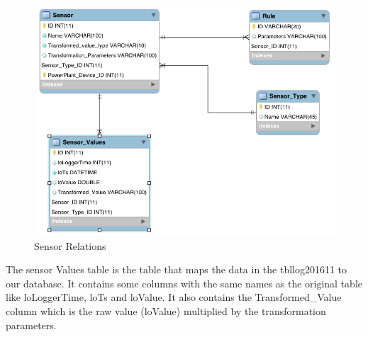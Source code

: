 \begin{figure}[H]
\centering
\includegraphics[scale=0.5]{Images/SensorRelations.png}
\caption[Sensor Relations]{Sensor Relations}
\end{figure}
The sensor Values table is the table that maps the data in the tbllog201611 to our database. It contains some columns with the same names as the original table like loLoggerTime, loTs and loValue. It also contains the Transformed\_Value column which is the raw value (loValue) multiplied by the transformation parameters.

